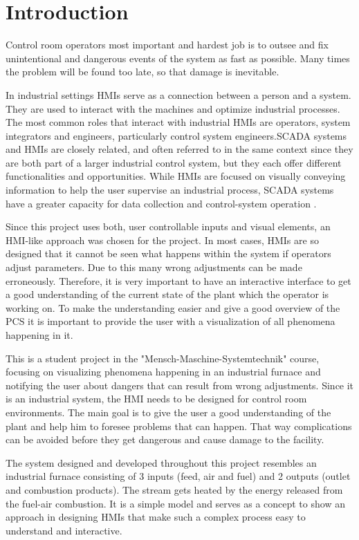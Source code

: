 \section*{Introduction}

Control room operators most important and hardest job is to outsee and fix unintentional and dangerous events of the system as fast as possible. Many times the problem will be found too late, so that damage is inevitable.

In industrial settings \acp{HMI} serve as a connection between a person and a system. They are used to interact with the machines and optimize industrial processes. The most common roles that interact with industrial \acp{HMI} are operators, system integrators and engineers, particularly control system engineers.\ac{SCADA} systems and \acp{HMI} are closely related, and often referred to in the same context since they are both part of a larger industrial control system, but they each offer different functionalities and opportunities. While \acp{HMI} are focused on visually conveying information to help the user supervise an industrial process, \ac{SCADA} systems have a greater capacity for data collection and control-system operation .\cite{HMIvsSCADA}

Since this project uses both, user controllable inputs and visual elements, an \ac{HMI}-like approach was chosen for the project. In most cases, \acp{HMI} are so designed that it cannot be seen what happens within the system if operators adjust parameters. Due to this many wrong adjustments can be made erroneously. Therefore, it is very important to have an interactive interface to get a good understanding of the current state of the plant which the operator is working on. To make the understanding easier and give a good overview of the \ac{PCS} it is important to provide the user with a visualization of all phenomena happening in it.

This is a student project in the "Mensch-Maschine-Systemtechnik" course, focusing on visualizing phenomena happening in an industrial furnace and notifying the user about dangers that can result from wrong adjustments. Since it is an industrial system, the \ac{HMI} needs to be designed for control room environments. The main goal is to give the user a good understanding of the plant and help him to foresee problems that can happen. That way complications can be avoided before they get dangerous and cause damage to the facility.

The system designed and developed throughout this project resembles an industrial furnace consisting of 3 inputs (feed, air and fuel) and 2 outputs (outlet and combustion products). The stream gets heated by the energy released from the fuel-air combustion. It is a simple model and serves as a concept to show an approach in designing \acp{HMI} that make such a complex process easy to understand and interactive.

